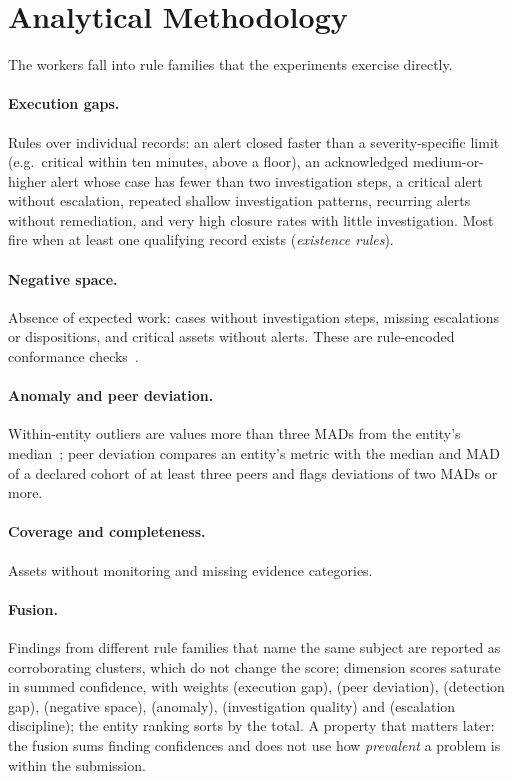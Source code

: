 \section{Analytical Methodology}
\label{sec:analytics}

The workers fall into rule families that the experiments exercise directly.

\paragraph{Execution gaps.} Rules over individual records: an alert closed faster
than a severity-specific limit (e.g.\ critical within ten minutes, above a floor),
an acknowledged medium-or-higher alert whose case has fewer than two investigation
steps, a critical alert without escalation, repeated shallow investigation patterns,
recurring alerts without remediation, and very high closure rates with little
investigation. Most fire when at least one qualifying record exists
(\emph{existence rules}).

\paragraph{Negative space.} Absence of expected work: cases without investigation
steps, missing escalations or dispositions, and critical assets without alerts.
These are rule-encoded conformance checks~\citep{carmona2018conformance}.

\paragraph{Anomaly and peer deviation.} Within-entity outliers are values more than
three MADs from the entity's median~\citep{leys2013mad}; peer deviation compares an
entity's metric with the median and MAD of a declared cohort of at least three
peers and flags deviations of two MADs or more.

\paragraph{Coverage and completeness.} Assets without monitoring and missing
evidence categories.

\paragraph{Fusion.} Findings from different rule families that name the same
subject are reported as corroborating clusters, which do not change the score;
dimension scores saturate in summed confidence, with weights
 (execution gap),  (peer deviation),
 (detection gap),  (negative space),
 (anomaly),  (investigation quality)
and  (escalation discipline); the entity ranking
sorts by the total.
A property that matters later: the fusion sums finding confidences and does not
use how \emph{prevalent} a problem is within the submission.
